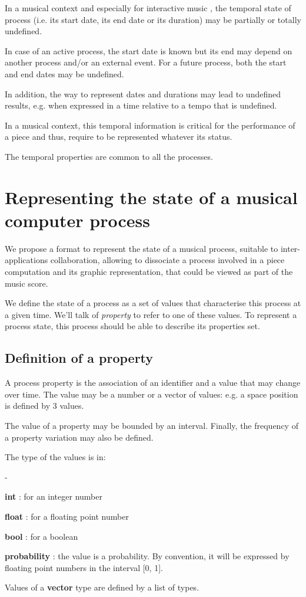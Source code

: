 \documentclass{article}
\newenvironment{state}
{ \begin{list}
	{-}
	{	 \setlength{\leftmargin}{6mm}
	 	\setlength{\itemsep}{-3pt}}
}
{ \end{list} }
\begin{document}
In a musical context and especially for interactive music \cite{Rowe:1992:IMS:530519}, the temporal state of process (i.e. its start date, its end date or its duration) may be partially or totally undefined. 

In case of an active process, the start date is known but its end may depend on another process and/or an external event. For a future process, both the start and end dates may be undefined.

In addition, the way to represent dates and durations may lead to undefined results, e.g. when expressed in a time relative to a tempo that is undefined.

In a musical context, this temporal information is critical for the performance of a piece and thus, require to be represented whatever its status.

The temporal properties are common to all the processes.


\section{Representing the state of a musical computer process}
We propose a format to represent the state of a musical process, suitable to inter-applications collaboration, allowing to dissociate a process involved in a piece computation and its graphic representation, that could be viewed as part of the music score.

We define the state of a process as a set of values that characterise this process at a given time.
We'll talk of \emph{property} to refer to one of these values. To represent a process state, this process should be able to describe its properties set.


\subsection{Definition of a property}
A process property is the association of an identifier and a value that may change over time. The value may be a number or a vector of values: e.g. a space position is defined by 3 values.

The value of a property may be bounded by an interval. Finally, the frequency of a property variation may also be defined.

The type of the values is in:
\begin{state}
\item \textbf{int} : for an integer number 
\item \textbf{float} : for a floating point number
\item \textbf{bool} : for a boolean 
\item \textbf{probability} : the value is a probability. By convention, it will be expressed by floating point numbers in the interval [0, 1]. 
\end{state}
Values of a \textbf{vector} type are defined by a list of types.
\end{document}
